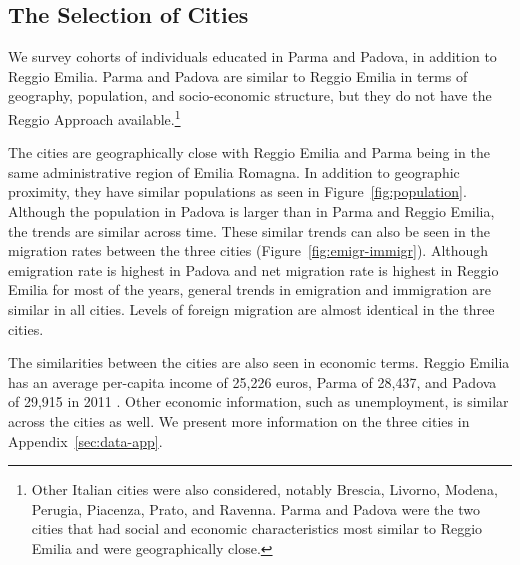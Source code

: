 \subsection{The Selection of Cities}

We survey cohorts of individuals educated in Parma and Padova, in addition to Reggio Emilia. Parma and Padova are similar to Reggio Emilia in terms of geography, population, and socio-economic structure, but they do not have the Reggio Approach available.\footnote{Other Italian cities were also considered, notably Brescia, Livorno, Modena, Perugia, Piacenza, Prato, and Ravenna. Parma and Padova were the two cities that had social and economic characteristics most similar to Reggio Emilia and were geographically close.}

The cities are geographically close with Reggio Emilia and Parma being in the same administrative region of Emilia Romagna. In addition to geographic proximity, they have similar populations as seen in Figure~\ref{fig:population}. Although the population in Padova is larger than in Parma and Reggio Emilia, the trends are similar across time. These similar trends can also be seen in the migration rates between the three cities (Figure~\ref{fig:emigr-immigr}). Although emigration rate is highest in Padova and net migration rate is highest in Reggio Emilia for most of the years, general trends in emigration and immigration are similar in all cities. Levels of foreign migration are almost identical in the three cities.

The similarities between the cities are also seen in economic terms. Reggio Emilia has an average per-capita income of 25,226 euros, Parma of 28,437, and Padova of 29,915 in 2011 \citep{Comuni-Italiani_2017_Redditi-Ipref-per-Regione-2011}. Other economic information, such as unemployment, is similar across the cities as well. We present more information on the three cities in Appendix~\ref{sec:data-app}.

